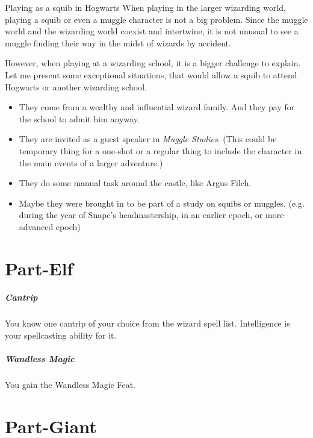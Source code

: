 \documentclass[a4paper,twocolumn,openany,nodeprecatedcode]{dndbook}
\begin{document}
        \begin{DndSidebar}{Playing as a squib in Hogwarts}
            When playing in the larger wizarding world,
            playing a squib or even a muggle character is not a big problem.
            Since the muggle world and the wizarding world coexist and intertwine,
            it is not unusual to see a muggle finding their way in the midst of wizards by accident.

            However, when playing at a wizarding school, it is a bigger challenge to explain.
            Let me present some exceptional situations, that would allow a squib to attend Hogwarts or another wizarding school.
            \begin{itemize}
                \item They come from a wealthy and influential wizard family.
                      And they pay for the school to admit him anyway.
                \item They are invited as a guest speaker in \textit{Muggle Studies}.
                      (This could be temporary thing for a one-shot or a regular thing to include the character in the main events of a larger adventure.)
                \item They do some manual task around the castle, like Argus Filch.
                \item Maybe they were brought in to be part of a study on squibs or muggles.
                      (e.g. during the year of Snape's headmastership, in an earlier epoch, or more advanced epoch)
            \end{itemize}
        \end{DndSidebar}

    \section{Part-Elf}

        \subparagraph{Cantrip} You know one cantrip of your choice from the wizard spell list. Intelligence is your spellcasting ability for it.

        \subparagraph{Wandless Magic} You gain the Wandless Magic Feat.


    \section{Part-Giant}
\end{document}
